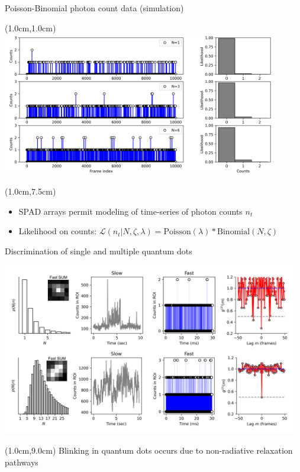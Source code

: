 \documentclass{beamer}					%
\begin{document}
\begin{frame}{Poisson-Binomial photon count data (simulation)}
\begin{textblock*}{12cm}(1.0cm,1.0cm)
\includegraphics[width=12cm]{../../spad/spad/media/Counts.png}
\end{textblock*}
\begin{textblock*}{13cm}(1.0cm,7.5cm)
\begin{itemize}
\item SPAD arrays permit modeling of time-series of photon counts $n_{t}$
\item Likelihood on counts: $\mathcal{L}(n_t\lvert N,\zeta,\lambda) = \mathrm{Poisson}(\lambda)* \mathrm{Binomial}(N,\zeta)$
\end{itemize}
\end{textblock*}

\end{frame}

\begin{frame}{Discrimination of single and multiple quantum dots}
\begin{center}
\includegraphics[width=13cm]{../../spad/spad/media/CountQD.png}
\end{center}
\begin{textblock*}{14cm}(1.0cm,9.0cm)
Blinking in quantum dots occurs due to non-radiative relaxation pathways
\end{textblock*}

\end{frame}
\end{document}
